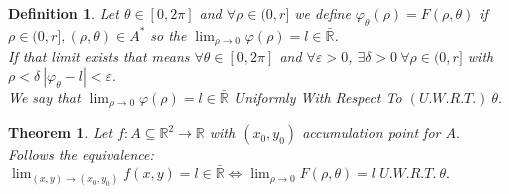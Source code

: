 \documentclass{article}
\newtheorem{theorem}{Theorem}
\newtheorem{definition}{Definition}
\begin{document}
    \begin{definition}
        Let $\theta \in [0,2\pi]$ and $\forall \rho \in (0,r]$ we define $\varphi_\theta(\rho) = F(\rho, \theta)$ if $\rho \in (0,r], (\rho, \theta) \in A^*$ so the $\lim_{\rho \to 0} \varphi(\rho) = l \in \bar{\mathbb{R}}$. \\
        If that limit exists that means $\forall \theta \in [0, 2\pi]$ and $\forall \varepsilon > 0$, $\exists \delta > 0 \ \forall \rho \in (0,r]$ with $\rho < \delta \ \left\lvert \varphi_\theta - l \right\rvert < \varepsilon.$ \\
        We say that $\lim_{\rho \to 0} \varphi(\rho) = l \in \bar{\mathbb{R}} $ Uniformly With Respect To $(U.W.R.T.) \ \theta.$     
    \end{definition}
            
    \begin{theorem}
        Let $f:A\subseteq \mathbb{R}^2 \rightarrow \mathbb{R} $ with $(x_0,y_0)$ accumulation point for $A.$ \\ Follows the equivalence: \\ $\lim_{(x,y) \to (x_0,y_0)} f(x,y) = l \in \bar{\mathbb{R}} \Longleftrightarrow \lim_{\rho \to 0} F(\rho, \theta ) = l \ U.W.R.T. \ \theta.$ 
    \end{theorem}
\end{document}
